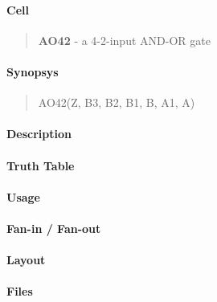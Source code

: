 \label{AO42}
\paragraph{Cell}
\begin{quote}
    \textbf{AO42} - a 4-2-input AND-OR gate
\end{quote}

\paragraph{Synopsys}
\begin{quote}
    AO42(Z, B3, B2, B1, B, A1, A)
\end{quote}

\paragraph{Description}

%

\paragraph{Truth Table}
%

\paragraph{Usage}

\paragraph{Fan-in / Fan-out}

\paragraph{Layout}

\paragraph{Files}
